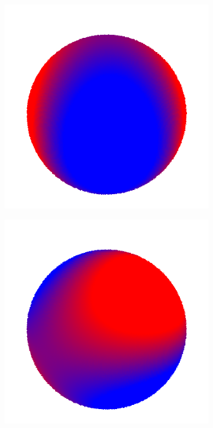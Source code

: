 \documentclass{article}
\begin{document}
\begin{figure}[!h]
\begin{subfigure}{.1\textwidth}
\end{subfigure}
\begin{subfigure}{.1\textwidth}
  \centering
  \includegraphics[width=\linewidth]{figs/spherical_harmonics/harmonics_4.png}  
\end{subfigure}
\begin{subfigure}{.1\textwidth}
  \centering
  \includegraphics[width=\linewidth]{figs/spherical_harmonics/harmonics_5.png}  

\end{subfigure}
\end{figure}
\end{document}
